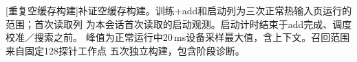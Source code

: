 \par\medskip\noindent\begin{minipage}{\linewidth}
\centering\captionsetup{hypcap=false}
[重复空缓存构建]{补证空缓存构建。训练+add和启动列为三次正常热输入页运行的范围；首次读取列
为本会话首次读取的启动观测。启动计时结束于add完成、调度校准／搜索之前。
峰值为正常运行中20\,ms设备采样最大值，含上下文。召回范围来自固定128探针工作点
五次独立构建，包含阶段诊断。}
\label{tab:7-build-repeat}
\scriptsize\setlength{\tabcolsep}{3pt}

\end{minipage}\par\medskip
